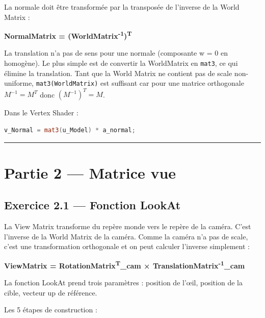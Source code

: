 \documentclass[11pt,a4paper]{article}
\begin{document}
La normale doit être transformée par la transposée de l'inverse de la World Matrix :

\textbf{NormalMatrix = (WorldMatrix\textsuperscript{-1})\textsuperscript{T}}

La translation n'a pas de sens pour une normale (composante w = 0 en homogène). Le plus simple est de convertir la WorldMatrix en \texttt{mat3}, ce qui élimine la translation. Tant que la World Matrix ne contient pas de scale non-uniforme, \texttt{mat3(WorldMatrix)} est suffisant car pour une matrice orthogonale $M^{-1} = M^T$ donc $(M^{-1})^T = M$.

Dans le Vertex Shader :

\begin{lstlisting}[language=GLSL]
v_Normal = mat3(u_Model) * a_normal;
\end{lstlisting}

\vspace{1em}\hrule\vspace{1em}

\section{Partie 2 — Matrice vue}

\subsection{Exercice 2.1 — Fonction LookAt}

La View Matrix transforme du repère monde vers le repère de la caméra. C'est l'inverse de la World Matrix de la caméra. Comme la caméra n'a pas de scale, c'est une transformation orthogonale et on peut calculer l'inverse simplement :

\textbf{ViewMatrix = RotationMatrix\textsuperscript{T}\_{cam} × TranslationMatrix\textsuperscript{-1}\_{cam}}

La fonction LookAt prend trois paramètres : position de l'œil, position de la cible, vecteur up de référence.

Les 5 étapes de construction :
\end{document}
